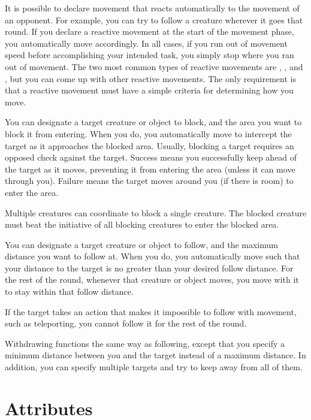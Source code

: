         It is possible to declare movement that reacts automatically to the movement of an opponent.
        For example, you can try to follow a creature wherever it goes that round.
        If you declare a reactive movement at the start of the movement phase, you automatically move accordingly.
        In all cases, if you run out of movement speed before accomplishing your intended task, you simply stop where you ran out of movement.
        The two most common types of reactive movements are , , and , but you can come up with other reactive movements.
        The only requirement is that a reactive movement must have a simple criteria for determining how you move.

        \label{Blocking} You can designate a target creature or object to block, and the area you want to block it from entering.
        When you do, you automatically move to intercept the target as it approaches the blocked area.
        Usually, blocking a target requires an opposed  check against the target.
        Success means you successfully keep ahead of the target as it moves, preventing it from entering the area (unless it can move through you).
        Failure means the target moves around you (if there is room) to enter the area.

        Multiple creatures can coordinate to block a single creature.
        The blocked creature must beat the initiative of all blocking creatures to enter the blocked area.

        \label{Following} You can designate a target creature or object to follow, and the maximum distance you want to follow at. When you do, you automatically move such that your distance to the target is no greater than your desired follow distance. For the rest of the round, whenever that creature or object moves, you move with it to stay within that follow distance.

        If the target takes an action that makes it impossible to follow with movement, such as teleporting, you cannot follow it for the rest of the round.

        \label{Withdrawing} Withdrawing functions the same way as following, except that you specify a minimum distance between you and the target instead of a maximum distance.
        In addition, you can specify multiple targets and try to keep away from all of them.

\section{Attributes}


